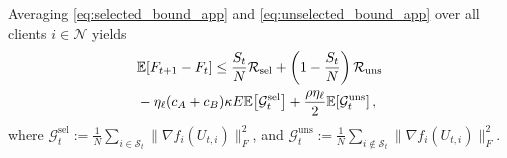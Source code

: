 \documentclass[lettersize,journal]{IEEEtran}
\begin{document}
	Averaging \eqref{eq:selected_bound_app} and
	\eqref{eq:unselected_bound_app} over all clients $i \in \mathcal{N}$ yields
	\begin{align}
		&\mathbb{E}[F_{t+1}-F_t]
		\le
		\frac{S_t}{N}\mathcal{R}_{\mathrm{sel}}
		+\left(1-\frac{S_t}{N}\right)\mathcal{R}_{\mathrm{uns}}
		\notag\\
		&
		-\eta_{\ell}(c_A+c_B)\kappa E \mathbb{E}\!\left[\mathcal{G}_t^{\mathrm{sel}}\right]+\frac{\rho\eta_{\ell}}{2}\mathbb{E}\!\left[\mathcal{G}_t^{\mathrm{uns}}\right],
		\label{eq:aggregate_one_round}
	\end{align}
	where $ \mathcal{G}_t^{\mathrm{sel}}
	:=
	\frac{1}{N}
	\sum_{i\in\mathcal{S}_t}
	\|\nabla f_i(U_{t,i})\|_F^2$, and
	$\mathcal{G}_t^{\mathrm{uns}}
	:=
	\frac{1}{N}
	\sum_{i\notin\mathcal{S}_t}
	\|\nabla f_i(U_{t,i})\|_F^2$.
	
\end{document}
